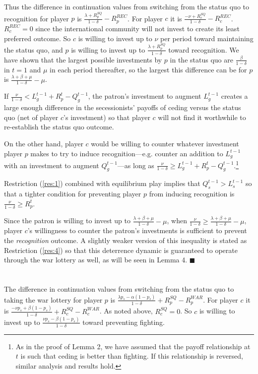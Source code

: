 \documentclass[11pt,letterpaper, notitlepage]{article}
\newcommand{\de}{\delta}
\begin{document}
Thus the difference in continuation values from switching from the status quo to recognition for player $p$ is $\frac{\lambda +R_p^{SQ}}{1 -\de} -R_p^{REC}$. For player $c$ it is $\frac{-\nu + R_c^{SQ}}{1 -\de}-R_c^{REC}$. $R_c^{REC} =0$ since the international community will not invest to create its least preferred outcome. So $c$ is willing to invest up to $\nu$ per period toward maintaining the status quo, and $p$ is willing to invest up to $\frac{\lambda +R_p^{SQ}}{1 -\de}$ toward recognition. We have shown that the largest possible investments by $p$ in the status quo are $\frac{\beta}{1 -\de}$ in $t=1$ and $\mu$ in each period thereafter, so the largest this difference can be for $p$ is $\frac{\lambda + \beta + \mu}{1 -\de} -\mu$.

If $\frac{\nu}{1-\de} < L_g^{t-1} + R_p^t - Q_g^{t-1}$, the patron's investment to augment $L_g^{t-1}$ creates a large enough difference in the secessionists' payoffs of ceding versus the status quo (net of player $c$'s investment) so that player $c$ will not find it worthwhile to re-establish the status quo outcome.

On the other hand, player $c$ would be willing to counter whatever investment player $p$ makes to try to induce recognition---e.g. counter an addition to $L_g^{t-1}$ with an investment to augment $Q_g^{t-1}$---as long as $\frac{\nu}{1-\de} \geq L_g^{t-1} + R_p^t - Q_g^{t-1}$.\footnote{As in the proof of Lemma 2, we have assumed that the payoff relationship at $t$ is such that ceding is better than fighting. If this relationship is reversed, similar analysis and results hold.}

Restriction (\ref{res:1}) combined with equilibrium play implies that  $Q_s^{t-1} > L_s^{t-1}$ so that a tighter condition for preventing player $p$ from inducing recognition is $\frac{\nu}{1 -\de} \geq R_p^t$. 

Since the patron is willing to invest up to $\frac{\lambda + \beta + \mu}{1 -\de} -\mu$, when $\frac{\nu}{1 -\de} \geq \frac{\lambda + \beta + \mu}{1 -\de} -\mu$, player $c$'s willingness to counter the patron's investments is sufficient to prevent the \emph{recognition} outcome. A slightly weaker version of this inequality is stated as Restriction (\ref{res:4}) so that this deterrence dynamic is guaranteed to operate through the war lottery as well, as will be seen in Lemma 4. \hfill $\blacksquare$
\\
\\
 \\
The difference in continuation values from switching from the status quo to taking the war lottery for player $p$ is $\frac{\lambda p_s - \alpha (1-p_s)}{1 -\de} +R_p^{SQ} -R_p^{WAR}$. For player $c$ it is $\frac{-\nu p_s + \beta (1-p_s)}{1 -\de} + R_c^{SQ} -R_c^{WAR}$. As noted above, $R_c^{SQ} =0$. So $c$ is willing to invest up to $\frac{\nu p_s - \beta (1-p_s)}{1 -\de}$ toward preventing fighting.
\end{document}
